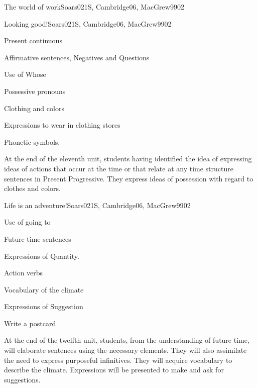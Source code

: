 \begin{syllabus}
\begin{unit}{The world of work}{}{Soars021S, Cambridge06, MacGrew99}{0}{2}
\end{unit}

\begin{unit}{Looking good!}{}{Soars021S, Cambridge06, MacGrew99}{0}{2}
   \begin{topics}
      \item Present continuous
      \item Affirmative sentences, Negatives and Questions 
      \item Use of Whose
      \item Possessive pronouns
      \item Clothing and colors
      \item Expressions to wear in clothing stores
      \item Phonetic symbols.
   \end{topics}

   \begin{learningoutcomes}
      \item At the end of the eleventh unit, students having identified the idea of expressing ideas of actions that occur at the time or that relate at any time structure sentences in Present Progressive. They express ideas of possession with regard to clothes and colors.
   \end{learningoutcomes}

\end{unit}

\begin{unit}{Life is an adventure!}{}{Soars021S, Cambridge06, MacGrew99}{0}{2}
   \begin{topics}
      \item Use of going to
      \item Future time sentences
      \item Expressions of Quantity.
      \item Action verbs
      \item Vocabulary of the climate
      \item Expressions of Suggestion
      \item Write a postcard
   \end{topics}
   \begin{learningoutcomes}
      \item At the end of the twelfth unit, students, from the understanding of future time, will elaborate sentences using the necessary elements. They will also assimilate the need to express purposeful infinitives. They will acquire vocabulary to describe the climate. Expressions will be presented to make and ask for suggestions.
   \end{learningoutcomes}
\end{unit}


\end{syllabus}

